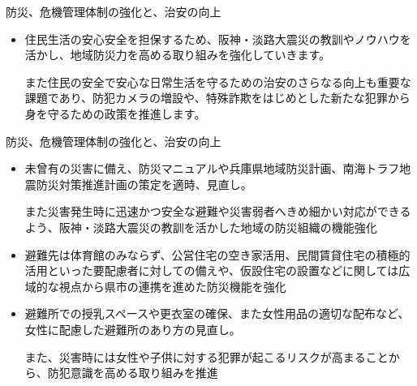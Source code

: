 \documentclass[dvipdfmx]{beamer}
\begin{document}
    \begin{frame}{防災、危機管理体制の強化と、治安の向上}{}
        \begin{small}
            \begin{itemize}
                \setlength{\parsep}{.5mm}
                \setlength{\itemsep}{2mm}
                \item 住民生活の安心安全を担保するため、阪神・淡路大震災の教訓やノウハウを活かし、地域防災力を高める取り組みを強化していきます。\par
                また住民の安全で安心な日常生活を守るための治安のさらなる向上も重要な課題であり、防犯カメラの増設や、特殊詐欺をはじめとした新たな犯罪から身を守るための政策を推進します。
            \end{itemize}
        \end{small}
    \end{frame}

    \begin{frame}{防災、危機管理体制の強化と、治安の向上}{}
        \begin{small}
            \begin{itemize}
                \setlength{\parsep}{.5mm}
                \setlength{\itemsep}{2mm}
                \item 未曾有の災害に備え、防災マニュアルや兵庫県地域防災計画、南海トラフ地震防災対策推進計画の策定を適時、見直し。\par
                また災害発生時に迅速かつ安全な避難や災害弱者へきめ細かい対応ができるよう、阪神・淡路大震災の教訓を活かした地域の防災組織の機能強化
                \item 避難先は体育館のみならず、公営住宅の空き家活用、民間賃貸住宅の積極的活用といった要配慮者に対しての備えや、仮設住宅の設置などに関しては広域的な視点から県市の連携を進めた防災機能を強化
                \item 避難所での授乳スペースや更衣室の確保、また女性用品の適切な配布など、女性に配慮した避難所のあり方の見直し。\par
                また、災害時には女性や子供に対する犯罪が起こるリスクが高まることから、防犯意識を高める取り組みを推進
            \end{itemize}
        \end{small}
    \end{frame}
\end{document}
